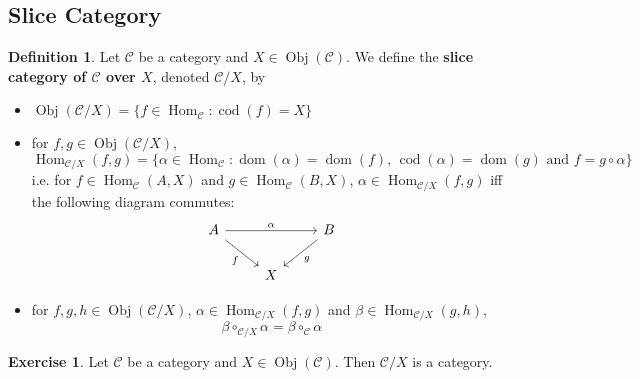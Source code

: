 \documentclass{book}
\theoremstyle{definition}
\newtheorem{defn}[definition]{Definition}
\newtheorem{ex}[definition]{Exercise}
\newcommand{\al}{\alpha}
\newcommand{\be}{\beta}
\newcommand{\MC}{\mathcal{C}}
\newcommand{\lex}[1]{\label{ex:#1}}
\newcommand{\ld}[1]{\label{defn:#1}}
\DeclareMathOperator{\dom}{dom}
\DeclareMathOperator{\cod}{cod}
\DeclareMathOperator{\Obj}{Obj}
\DeclareMathOperator{\Hom}{Hom}
\DeclareMathOperator*{\0}{\mbf{0}}
\DeclareMathOperator*{\1}{\mbf{1}}
\begin{document}
	
	
	
	\subsection{Slice Category}
	
	\begin{defn} \ld{12006}
		Let $\MC$ be a category and $X \in \Obj(\MC)$. We define the \textbf{slice category of $\MC$ over $X$}, denoted $\MC / X$, by
		\begin{itemize}
			\item $\Obj(\MC / X) = \{f \in \Hom_{\MC}: \cod(f) = X\}$
			\item for $f,g \in \Obj(\MC / X)$, 
			$$\Hom_{\MC / X}(f, g) = \{\al \in \Hom_{\MC} : \dom(\al) = \dom(f) \text{, } \cod(\al) = \dom(g) \text{ and } f = g \circ \al \}$$
			i.e. for $f \in \Hom_{\MC}(A, X)$ and $g \in \Hom_{\MC}(B, X)$, $\al \in \Hom_{\MC / X}(f, g)$ iff the following diagram commutes: 
			\[ 
			\begin{tikzcd}
				A \arrow[rr, "\al"] \arrow[dr, "f"'] 	
				& & B  \arrow[dl, "g"] \\
				& X 
			\end{tikzcd}
			\]
			\item for $f,g, h \in \Obj(\MC / X)$, $\al \in \Hom_{\MC / X}(f, g)$ and $\be \in \Hom_{\MC / X}(g, h)$, 
			$$\be \circ_{\MC / X} \al = \be \circ_{\MC} \al$$
		\end{itemize}
	\end{defn}
	
	\begin{ex}  \lex{12007}
		Let $\MC$ be a category and $X \in \Obj(\MC)$. Then $\MC / X$ is a category.
	\end{ex}
\end{document}

